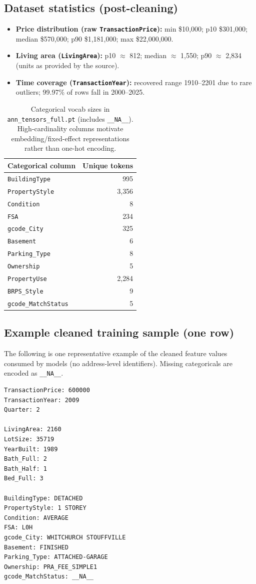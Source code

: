 \documentclass[11pt]{article}
\begin{document}
\subsection{Dataset statistics (post-cleaning)}
\begin{itemize}[leftmargin=*]
  \item \textbf{Price distribution (raw \texttt{TransactionPrice}):} min \$10{,}000; p10 \$301{,}000; median \$570{,}000; p90 \$1{,}181{,}000; max \$22{,}000{,}000.
  \item \textbf{Living area (\texttt{LivingArea}):} p10 \(\approx\) 812; median \(\approx\) 1{,}550; p90 \(\approx\) 2{,}834 (units as provided by the source).
  \item \textbf{Time coverage (\texttt{TransactionYear}):} recovered range 1910--2201 due to rare outliers; 99.97\% of rows fall in 2000--2025.
\end{itemize}

\begin{table}[h]
\centering
\small
\begin{tabular}{@{}lr@{}}
\toprule
Categorical column & Unique tokens \\
\midrule
\texttt{BuildingType} & 995 \\
\texttt{PropertyStyle} & 3{,}356 \\
\texttt{Condition} & 8 \\
\texttt{FSA} & 234 \\
\texttt{gcode\_City} & 325 \\
\texttt{Basement} & 6 \\
\texttt{Parking\_Type} & 8 \\
\texttt{Ownership} & 5 \\
\texttt{PropertyUse} & 2{,}284 \\
\texttt{BRPS\_Style} & 9 \\
\texttt{gcode\_MatchStatus} & 5 \\
\bottomrule
\end{tabular}
\caption{Categorical vocab sizes in \texttt{ann\_tensors\_full.pt} (includes \texttt{\_\_NA\_\_}). High-cardinality columns motivate embedding/fixed-effect representations rather than one-hot encoding.}
\label{tab:cat-cardinalities}
\end{table}

\subsection{Example cleaned training sample (one row)}
The following is one representative example of the cleaned feature values consumed by models (no address-level identifiers). Missing categoricals are encoded as \texttt{\_\_NA\_\_}.
\begin{lstlisting}
TransactionPrice: 600000
TransactionYear: 2009
Quarter: 2

LivingArea: 2160
LotSize: 35719
YearBuilt: 1989
Bath_Full: 2
Bath_Half: 1
Bed_Full: 3

BuildingType: DETACHED
PropertyStyle: 1 STOREY
Condition: AVERAGE
FSA: L0H
gcode_City: WHITCHURCH STOUFFVILLE
Basement: FINISHED
Parking_Type: ATTACHED-GARAGE
Ownership: PRA_FEE_SIMPLE1
gcode_MatchStatus: __NA__
\end{lstlisting}
\end{document}
